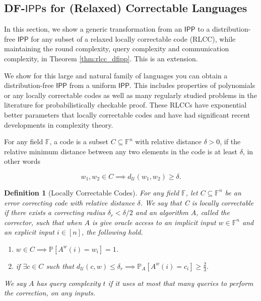 \documentclass[10pt,a4paper]{article}
\newtheorem{definition}{Definition}[section]
\newcommand{\IPP}{\mathsf{IPP}}
\newcommand{\F}{\mathbb{F}}
\newcommand{\sU}{\mathcal{U}}
\begin{document}
\subsection{DF-$\IPP$s for (Relaxed) Correctable Languages}
\label{sec:corr}


In this section, we show a generic transformation from an $\IPP$ to a distribution-free $\IPP$ for any subset of a relaxed locally correctable code (RLCC), while maintaining the round complexity, query complexity and communication complexity, in Theorem \ref{thm:rlcc_dfipp}. This is an extension.

We show for this large and natural family of languages you can obtain a distribution-free $\IPP$ from a uniform $\IPP$. This includes properties of polynomials or any locally correctable codes as well as many regularly studied problems in the literature for probabilistically checkable proof. These RLCCs have exponential better parameters that locally correctable codes and have had significant recent developments in complexity theory.

For any field $\F$, a code is a subset $C\subseteq\F^{n}$ with relative distance $\delta>0$, if the relative minimum distance between any two elements in the code is at least $\delta$, in other words

\begin{equation*}
    w_{1}, w_{2}\in C \implies d_{\mathcal{U}}(w_{1}, w_{2})\geq \delta.
\end{equation*}

\begin{definition}[Locally Correctable Codes]
For any field $\F$, let $C \subseteq \F^n$ be an error correcting code with relative distance $\delta$. 
We say that C is locally correctable if there exists a correcting radius $\delta_{r}< \delta/2$ and an algorithm $A$, called the \textit{corrector}, such that when $A$ is give oracle access to an implicit input $w\in \F^{n}$ and an explicit input $i \in [n]$, the following hold.
\begin{enumerate}
    \item $w\in C \implies \mathbb{P}[A^w(i)=w_{i}]=1$.
    \item if $\exists c\in C$ such that $d_{\sU}(c,w) \leq \delta_{r}\implies\mathbb{P}_A \left[ A^w(i)=c_{i} \right] \geq \frac{2}{3}.$

\end{enumerate}

We say $A$ has query complexity $t$ if it uses at most that many queries to perform the correction, on any inputs.
\end{definition}
\end{document}
